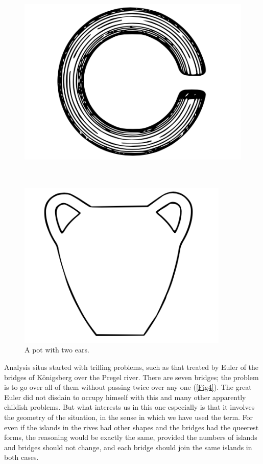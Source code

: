 \documentclass[12pt,oneside]{book}
\begin{document}
\begin{figure}
    \centering
    \includegraphics[height=10cm]{Fig2.png}
    \caption{}
    \label{Fig2}
\end{figure}

\begin{figure}
    \centering
    \includegraphics[height=8cm]{Fig3.png}
    \caption{A pot with two ears.}
    \label{Fig3}
\end{figure}

Analysis situs started with trifling problems, such as that treated by Euler of the bridges of K\"onigsberg over the Pregel river. There are seven bridges; the problem is to go over all of them without passing twice over any one (\ref{Fig4}). The great Euler did not disdain to occupy himself with this and many other apparently childish problems. But what interests us in this one especially is that it involves the geometry of the situation, in the sense in which we have used the term. For even if the islands in the rives had other shapes and the bridges had the queerest forms, the reasoning would be exactly the same, provided the numbers of islands and bridges should not change, and each bridge should join the same islands in both cases. \par 
\end{document}
